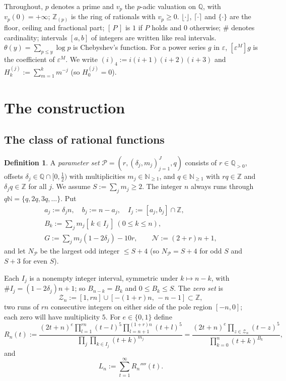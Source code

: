 \documentclass[11pt]{amsart}
\theoremstyle{definition}
\newtheorem{definition}[theorem]{Definition}
\theoremstyle{remark}
\numberwithin{equation}{section}
\newcommand{\NN}{\mathbb{N}}
\newcommand{\ZZ}{\mathbb{Z}}
\newcommand{\QQ}{\mathbb{Q}}
\newcommand{\cN}{\mathcal{N}}
\newcommand{\cP}{\mathcal{P}}
\newcommand{\eps}{\varepsilon}
\newcommand{\ind}[1]{[\,#1\,]}
\begin{document}
Throughout, $p$ denotes a prime and $v_p$ the $p$-adic valuation on $\QQ$, with $v_p(0)=+\infty$;
$\ZZ_{(p)}$ is the ring of rationals with $v_p\ge0$. $\lfloor\cdot\rfloor$, $\lceil\cdot\rceil$ and $\{\cdot\}$
are the floor, ceiling and fractional part; $\ind{P}$ is $1$ if $P$ holds and $0$ otherwise; $\#$ denotes
cardinality; intervals $[a,b]$ of integers are written like real intervals. $\theta(y)=\sum_{p\le y}\log p$ is
Chebyshev's function. For a power series $g$ in $\eps$, $[\eps^M]g$ is the coefficient of $\eps^M$. We write
$(i)_4:=i(i+1)(i+2)(i+3)$ and $H_k^{(j)}:=\sum_{m=1}^{k}m^{-j}$ (so $H_0^{(j)}=0$).

\section{The construction}\label{sec:construction}

\subsection{The class of rational functions}
\begin{definition}\label{def:param}
A \emph{parameter set} $\cP=(r,(\delta_j,m_j)_{j=1}^J,q)$ consists of $r\in\QQ_{>0}$, offsets
$\delta_j\in\QQ\cap[0,\frac12)$ with multiplicities $m_j\in\NN_{\ge1}$, and $q\in\NN_{\ge1}$ with $rq\in\ZZ$ and
$\delta_jq\in\ZZ$ for all $j$. We assume $S:=\sum_jm_j\ge2$. The integer $n$ always runs through
$q\NN=\{q,2q,3q,\dots\}$. Put
\begin{gather*}
  a_j:=\delta_jn,\quad b_j:=n-a_j,\quad I_j:=[a_j,b_j]\cap\ZZ,\\
  B_k:=\sum_jm_j\ind{k\in I_j}\ (0\le k\le n),\\
  G:=\sum_jm_j(1-2\delta_j)-10r,\qquad \cN:=(2+r)n+1,
\end{gather*}
and let $N_\cP$ be the largest odd integer $\le S+4$ (so $N_\cP=S+4$ for odd $S$ and $S+3$ for even $S$).
\end{definition}

Each $I_j$ is a nonempty integer interval, symmetric under $k\mapsto n-k$, with $\#I_j=(1-2\delta_j)n+1$; so
$B_{n-k}=B_k$ and $0\le B_k\le S$. The \emph{zero set} is
\[
  \mathcal Z_n:=[1,rn]\cup[-(1+r)n,\,-n-1]\subset\ZZ,
\]
two runs of $rn$ consecutive integers on either side of the pole region $[-n,0]$; each zero will have
multiplicity $5$. For $e\in\{0,1\}$ define
\begin{equation}\label{eq:R}
  R_n(t):=\frac{(2t+n)^e\prod_{l=1}^{rn}(t-l)^5\prod_{l=n+1}^{(1+r)n}(t+l)^5}{\prod_{j}\prod_{k\in I_j}(t+k)^{m_j}}
  =\frac{(2t+n)^e\prod_{z\in\mathcal Z_n}(t-z)^5}{\prod_{k=0}^{n}(t+k)^{B_k}},
\end{equation}
and
\begin{equation}\label{eq:L}
  L_n:=\sum_{t=1}^{\infty}R_n''''(t).
\end{equation}
\end{document}
